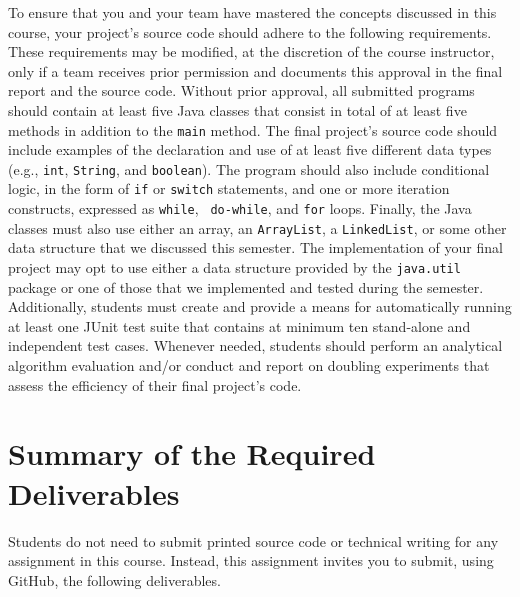 \documentclass[11pt]{article}
\begin{document}
To ensure that you and your team have mastered the concepts discussed in this
course, your project's source code should adhere to the following requirements.
These requirements may be modified, at the discretion of the course instructor,
only if a team receives prior permission and documents this approval in the
final report and the source code. Without prior approval, all submitted programs
should contain at least five Java classes that consist in total of at least five
methods in addition to the {\tt main} method. The final project's source code
should include examples of the declaration and use of at least five different
data types (e.g., {\tt int}, {\tt String}, and {\tt boolean}). The program
should also include conditional logic, in the form of {\tt if} or {\tt switch}
statements, and one or more iteration constructs, expressed as {\tt while}, {\tt
do-while}, and {\tt for} loops. Finally, the Java classes must also use either
an array, an {\tt ArrayList}, a {\tt LinkedList}, or some other data structure
that we discussed this semester. The implementation of your final project may
opt to use either a data structure provided by the {\tt java.util} package or
one of those that we implemented and tested during the semester. Additionally,
students must create and provide a means for automatically running at least one
JUnit test suite that contains at minimum ten stand-alone and independent test
cases. Whenever needed, students should perform an analytical algorithm
evaluation and/or conduct and report on doubling experiments that assess the
efficiency of their final project's code.

\section*{Summary of the Required Deliverables}

\noindent Students do not need to submit printed source code or technical
writing for any assignment in this course. Instead, this assignment invites you
to submit, using GitHub, the following deliverables.
\end{document}
